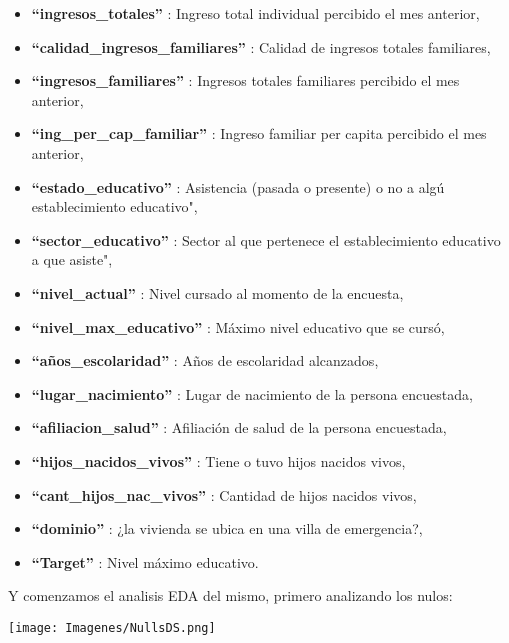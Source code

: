 \documentclass[a4paper]{article}
\begin{document}
\begin{itemize}
        \item \textbf{``ingresos\_totales''}             : Ingreso total individual percibido el mes anterior,
        \item \textbf{``calidad\_ingresos\_familiares''} : Calidad de ingresos totales familiares,
        \item \textbf{``ingresos\_familiares''}          : Ingresos totales familiares percibido el mes anterior,
        \item \textbf{``ing\_per\_cap\_familiar''}       : Ingreso familiar per capita percibido el mes anterior,
        \item \textbf{``estado\_educativo''}             : Asistencia (pasada o presente) o no a algú establecimiento educativo",
        \item \textbf{``sector\_educativo''}             : Sector al que pertenece el establecimiento educativo a que asiste",
        \item \textbf{``nivel\_actual''}                 : Nivel cursado al momento de la encuesta,
        \item \textbf{``nivel\_max\_educativo''}         : Máximo nivel educativo que se cursó,
        \item \textbf{``años\_escolaridad''}             : Años de escolaridad alcanzados,
        \item \textbf{``lugar\_nacimiento''}             : Lugar de nacimiento de la persona encuestada,
        \item \textbf{``afiliacion\_salud''}             : Afiliación de salud de la persona encuestada,
        \item \textbf{``hijos\_nacidos\_vivos''}         : Tiene o tuvo hijos nacidos vivos,
        \item \textbf{``cant\_hijos\_nac\_vivos''}       : Cantidad de hijos nacidos vivos,
        \item \textbf{``dominio''}                       : ¿la vivienda se ubica en una villa de emergencia?,
        \item \textbf{``Target''}                        : Nivel máximo educativo.
    \end{itemize}
 
   Y comenzamos el analisis EDA del mismo, primero analizando los nulos:

    \begin{center}
        \texttt{[image: Imagenes/NullsDS.png]}
    \end{center}
 
\end{document}

